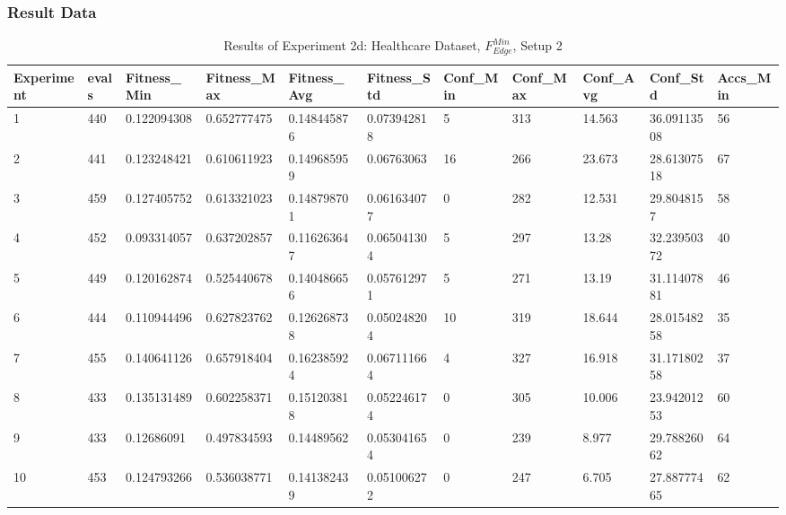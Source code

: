 		\subsubsection{Result Data}
		\label{sec:A_Exp2d_Data}
			\begin{table}[H]
				\caption{Results of Experiment 2d: Healthcare Dataset, $F_{Edge}^{Min}$, Setup 2}
				\label{tab:A_Exp2d_Data}
				\begin{adjustbox}{max width=380pt,keepaspectratio,angle=90}
					\begin{tabular}{|l|l|l|l|l|l|l|l|l|l|l|}
						\rowcolor[HTML]{EFEFEF} 
						\hline
						Experiment & evals & Fitness\_Min & Fitness\_Max & Fitness\_Avg & Fitness\_Std & Conf\_Min & Conf\_Max & Conf\_Avg & Conf\_Std   & Accs\_Min \\ \hline
						1          & 440   & 0.122094308  & 0.652777475  & 0.148445876  & 0.073942818  & 5         & 313       & 14.563    & 36.09113508 & 56        \\ \hline
						2          & 441   & 0.123248421  & 0.610611923  & 0.149685959  & 0.06763063   & 16        & 266       & 23.673    & 28.61307518 & 67        \\ \hline
						3          & 459   & 0.127405752  & 0.613321023  & 0.148798701  & 0.061634077  & 0         & 282       & 12.531    & 29.8048157  & 58        \\ \hline
						4          & 452   & 0.093314057  & 0.637202857  & 0.116263647  & 0.065041304  & 5         & 297       & 13.28     & 32.23950372 & 40        \\ \hline
						5          & 449   & 0.120162874  & 0.525440678  & 0.140486656  & 0.057612971  & 5         & 271       & 13.19     & 31.11407881 & 46        \\ \hline
						6          & 444   & 0.110944496  & 0.627823762  & 0.126268738  & 0.050248204  & 10        & 319       & 18.644    & 28.01548258 & 35        \\ \hline
						7          & 455   & 0.140641126  & 0.657918404  & 0.162385924  & 0.067111664  & 4         & 327       & 16.918    & 31.17180258 & 37        \\ \hline
						8          & 433   & 0.135131489  & 0.602258371  & 0.151203818  & 0.052246174  & 0         & 305       & 10.006    & 23.94201253 & 60        \\ \hline
						9          & 433   & 0.12686091   & 0.497834593  & 0.14489562   & 0.053041654  & 0         & 239       & 8.977     & 29.78826062 & 64        \\ \hline
						10         & 453   & 0.124793266  & 0.536038771  & 0.141382439  & 0.051006272  & 0         & 247       & 6.705     & 27.88777465 & 62        \\ \hline\hline

\end{tabular}
\end{adjustbox}
\end{table}
